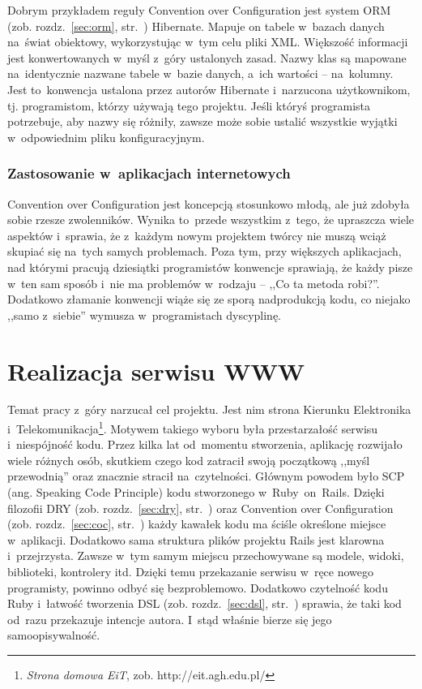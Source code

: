 \documentclass[a4paper,12pt,oneside]{report}
\begin{document}
Dobrym przykładem reguły Convention over Configuration jest system ORM (zob. rozdz.~\ref{sec:orm}, str.~\pageref{sec:orm}) Hibernate. Mapuje on tabele w~bazach danych na~świat obiektowy, wykorzystując w~tym celu pliki XML. Większość informacji jest konwertowanych w~myśl z~góry ustalonych zasad. Nazwy klas są mapowane na~identycznie nazwane tabele w~bazie danych, a~ich wartości -- na~kolumny. Jest to~konwencja ustalona przez autorów Hibernate i~narzucona użytkownikom, tj. programistom, którzy używają tego projektu. Jeśli któryś programista potrzebuje, aby nazwy się różniły, zawsze może sobie ustalić wszystkie wyjątki w~odpowiednim pliku konfiguracyjnym.

\subsection{Zastosowanie w~aplikacjach internetowych}
\label{coc:web}
Convention over Configuration jest koncepcją stosunkowo młodą, ale już zdobyła sobie rzesze zwolenników. Wynika to~przede wszystkim z~tego, że upraszcza wiele aspektów i~sprawia, że z~każdym nowym projektem twórcy nie muszą wciąż skupiać się na~tych samych problemach. Poza tym, przy większych aplikacjach, nad którymi pracują dziesiątki programistów konwencje sprawiają, że każdy pisze w~ten sam sposób i~nie ma problemów w~rodzaju -- ,,Co ta metoda robi?''. Dodatkowo złamanie konwencji wiąże się ze sporą nadprodukcją kodu, co niejako ,,samo z~siebie'' wymusza w~programistach dyscyplinę.

\chapter{Realizacja serwisu WWW}
\label{cha:app}
Temat pracy z~góry narzucał cel projektu. Jest nim strona Kierunku Elektronika i~Telekomunikacja\footnote{\emph{Strona domowa EiT}, zob. http://eit.agh.edu.pl/}. Motywem takiego wyboru była przestarzałość serwisu i~niespójność kodu. Przez kilka lat od~momentu stworzenia, aplikację rozwijało wiele różnych osób, skutkiem czego kod zatracił swoją początkową ,,myśl przewodnią'' oraz znacznie stracił na~czytelności. Głównym powodem było SCP (ang. Speaking Code Principle) kodu stworzonego w~Ruby~on~Rails. Dzięki filozofii DRY (zob. rozdz.~\ref{sec:dry}, str.~\pageref{sec:dry}) oraz Convention over Configuration (zob. rozdz.~\ref{sec:coc}, str.~\pageref{sec:coc}) każdy kawałek kodu ma ściśle określone miejsce w~aplikacji. Dodatkowo sama struktura plików projektu Rails jest klarowna i~przejrzysta. Zawsze w~tym samym miejscu przechowywane są modele, widoki, biblioteki, kontrolery itd. Dzięki temu przekazanie serwisu w~ręce nowego programisty, powinno odbyć się bezproblemowo. Dodatkowo czytelność kodu Ruby i~łatwość tworzenia DSL (zob. rozdz.~\ref{sec:dsl}, str.~\pageref{sec:dsl}) sprawia, że taki kod od~razu przekazuje intencje autora. I~stąd właśnie bierze się jego samoopisywalność.
\end{document}
